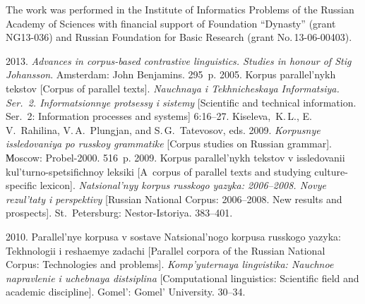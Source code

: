 

\Ack

\noindent
The work was performed in the Institute of Informatics Problems of the Russian Academy
of Sciences with financial support of Foundation ``Dynasty'' (grant NG13-036)
and Russian Foundation for Basic Research (grant No.\,13-06-00403).

  \begin{multicols}{2}

\renewcommand{\bibname}{\protect\rmfamily References}

{\small\frenchspacing
{%
\begin{thebibliography}{99}

 2013. \textit{Advances in corpus-based contrastive linguistics.
 Studies in honour of Stig
Johansson}. Amsterdam: John Benjamins. 295~p.
 2005. Korpus parallel'nykh tekstov [Corpus of parallel texts]. \textit{Nauchnaya i
Tekhnicheskaya Informatsiya. Ser.~2.
Informatsionnye protsessy i sistemy} [Scientific
and technical information. Ser.~2: Information processes and systems] 6:16--27.
Kiseleva,~K.\,L., E.\,V.~Rahilina, V.\,A.~Plungjan, and S.\,G.~Tatevosov, eds.
2009. \textit{Korpusnye issledovaniya po russkoy grammatike}
[Corpus studies on Russian grammar]. Мoscow: Probel-2000. 516~p.
 2009. Korpus parallel'nykh tekstov v issledovanii kul'turno-spetsifichnoy
 leksiki [A~corpus of parallel texts and studying culture-specific lexicon].
 \textit{Natsional'nyy korpus
russkogo yazyka: 2006--2008. Novye rezul'taty i perspektivy} [Russian National
Corpus: 2006--2008. New results and prospects]. St.\ Petersburg: Nestor-Istoriya.
383--401.

 2010. Parallel'nye korpusa v sostave Natsional'nogo korpusa russkogo yazyka:
Tekhnologii i reshaemye zadachi [Parallel corpora of the Russian National Corpus:
Technologies and problems].
\textit{Komp'yuternaya lingvistika: Nauchnoe napravlenie i
uchebnaya distsiplina} [Computational linguistics: Scientific field and academic
discipline]. Gomel': Gomel' University. 30--34.


\end{thebibliography}}}
\end{multicols}
